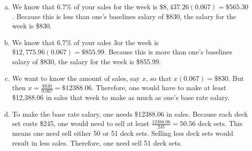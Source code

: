 \documentclass[11pt,letterpaper]{article}
\begin{document}
\sol
{\itshape
\begin{enumerate}[(a)]
\item We know that 6.7\% of your sales for the week is $\$8,437.26(0.067)= \$565.30$. Because this is less than one's baselines salary of \$830, the salary for the week is \$830. \pspace

\item We know that 6.7\% of your sales 3or the week is $\$12,775.96(0.067)= \$855.99$. Because this is more than one's baselines salary of \$830, the salary for the week is \$855.99. \pspace

\item We want to know the amount of sales, say $x$, so that $x(0.067)= \$830$. But then $x= \frac{\$830}{0.067}= \$12388.06$. Therefore, one would have to make at least \$12,388.06 in sales that week to make as much as one's base rate salary. \pspace

\item To make the base rate salary, one needs \$12388.06 in sales. Because each deck set costs \$245, one would need to sell at least $\frac{12388.06}{245}= 50.56$ deck sets. This means one need sell either 50 or 51 deck sets. Selling less deck sets would result in less sales. Therefore, one need sell 51 deck sets. 
\end{enumerate}
}


\end{document}
